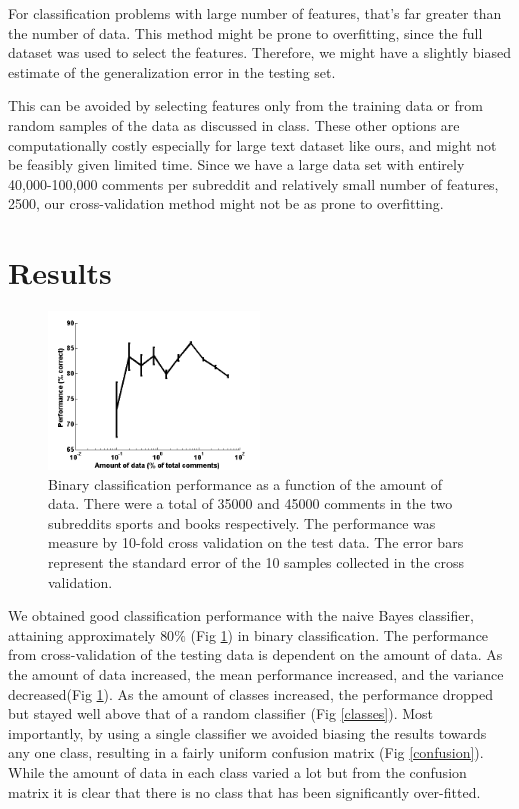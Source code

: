 \documentclass[10pt,twocolumn]{article}
\begin{document}
For classification problems with large number of features, that’s far greater than the number of data. This method might be prone to overfitting, since the full dataset was used to select the features. Therefore, we might have a slightly biased estimate of the generalization error in the testing set.

This can be avoided by selecting features only from the training data or from random samples of the data as discussed in class. These other options are computationally costly especially for large text dataset like ours, and might not be feasibly given limited time. Since we have a large data set with entirely 40,000-100,000 comments per subreddit and relatively small number of features, 2500, our cross-validation method might not be as prone to overfitting.

\section{Results}
\begin{figure}
    \centering
  	\includegraphics[width=0.5\textwidth]{./binary_data.png}
  \caption{ Binary classification performance as a function of the amount of data. There were a total of 35000 and 45000 comments in the two subreddits sports and books respectively. The performance was measure by 10-fold cross validation on the test data. The error bars represent the standard error of the 10 samples collected in the cross validation.}
  	\label{multiclass}
    \end{figure}
We obtained good classification performance with the naive Bayes classifier, attaining approximately $80\%$ (Fig \ref{multiclass}) in binary classification. The performance from cross-validation of the testing data is dependent on the amount of data. As the amount of data increased, the mean performance increased, and the variance decreased(Fig \ref{multiclass}). As the amount of classes increased, the performance dropped but stayed well above that of a random classifier (Fig \ref{classes}). Most importantly, by using a single classifier we avoided biasing the results towards any one class, resulting in a fairly uniform confusion matrix (Fig \ref{confusion}). While the amount of data in each class varied a lot but from the confusion matrix it is clear that there is no class that has been significantly over-fitted.
\end{document}
